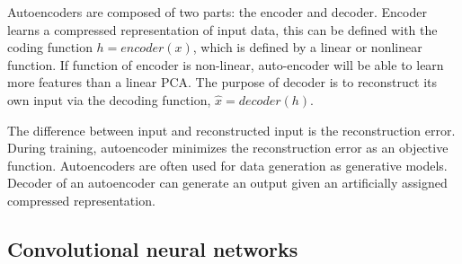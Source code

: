 Autoencoders are composed of two parts: the encoder and decoder. Encoder learns a compressed representation of input data, this can be defined with the coding function $h=encoder(x)$, which is defined by a linear or nonlinear function. If function of encoder is non-linear, auto-encoder will be able to learn more features than a linear PCA. The purpose of decoder is to reconstruct its own input via the decoding function, $\hat{x} = decoder(h)$.

\vspace{5mm} %

The difference between input and reconstructed input is the reconstruction error. During training, autoencoder minimizes the reconstruction error as an objective function. Autoencoders are often used for data generation as generative models. Decoder of an autoencoder can generate an output given an artificially assigned compressed representation.

\subsection{Convolutional neural networks}

